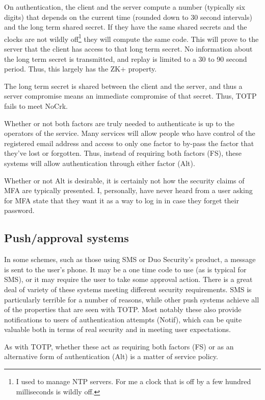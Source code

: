 \documentclass[12pt]{article}
\newcommand{\prop}[1]{\textsf{#1}}
\begin{document}
On authentication, the client and the server compute a number (typically six digits) that depends on the current time (rounded down to 30 second intervals) and the long term shared secret.
If they have the same shared secrets and the clocks are not wildly off\footnote{I used to manage NTP servers. For me a clock that is off by a few hundred milliseconds is wildly off.} they will compute the same code. This will prove to the server that the client has access to that long term secret. No information about the long term secret is transmitted, and replay is limited to a 30 to 90 second period.
Thus, this largely has the \prop{ZK+} property.

The long term secret is shared between the client and the server, and thus a server compromise means an immediate compromise of that secret. Thus, TOTP fails to meet \prop{NoCrk}.

Whether or not both factors are truly needed to authenticate is up to the operators of the service. Many services will allow people who have control of the registered email address and access to only one factor to by-pass the factor that they've lost or forgotten.
Thus, instead of requiring both factors (\prop{FS}), these systems will allow authentication through either factor (\prop{Alt}).

Whether or not \prop{Alt} is desirable, it is certainly not how the security claims of MFA are typically presented.
I, personally, have never heard from a user asking for MFA state that they want it as a way to log in in case they forget their password.

\subsection{Push/approval systems}\label{sec:push}

In some schemes, such as those using SMS or Duo Security's product,
a message is sent to the user's phone.
It may be a one time code to use (as is typical for SMS),
or it may require the user to take some approval action.
There is a great deal of variety of these systems
meeting different security requirements.
SMS is particularly terrible for a number of reasons, while other push systems achieve all of the properties that are seen with TOTP\@.
Most notably these also provide notifications to users of authentication
attempts (\prop{Notif}), which can be quite valuable both in terms of real security and in meeting user expectations.

As with TOTP, whether these act as requiring both factors (\prop{FS}) or as an alternative form of authentication (\prop{Alt}) is a matter of service policy.
\end{document}
